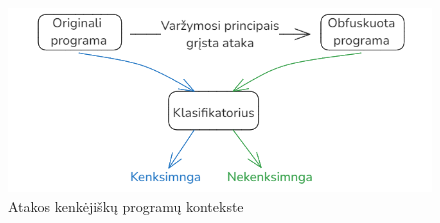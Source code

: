 \documentclass[12pt]{beamer}
\begin{document}
\begin{frame}
\begin{columns}[b]
        \begin{figure}
            \begin{small}
                \begin{center}
                    \includegraphics[width=\textwidth]{resources/malware_adversarial.png}
                \end{center}
                \caption{Atakos kenkėjiškų programų kontekste}
                \label{fig:malware_adversarial}
            \end{small}
        \end{figure}
    \end{columns}

\end{frame}
\end{document}

